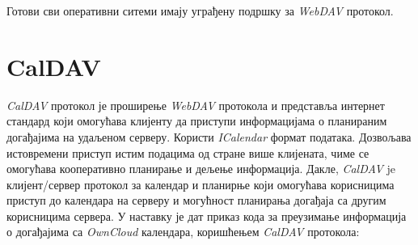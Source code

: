 Готови сви оперативни ситеми имају уграђену подршку за \textit{WebDAV} протокол.

\section {CalDAV}

\textit{CalDAV} протокол је проширење \textit{WebDAV} протокола и представља  интернет стандард који омогућава клијенту да приступи информацијама о планираним догађајима на удаљеном серверу. Користи \textit{ICalendar}\cite{ical} формат података. Дозвољава истовремени приступ истим подацима од стране више клијената, чиме се омогућава кооперативно планирање и дељење информација. Дакле, \textit{CalDAV} je клијент/сервер протокол за календар и планирње који омогућава корисницима приступ до календара на серверу и могућност планирања догађаја са другим корисницима сервера. У наставку је дат приказ кода за преузимање информација о догађајима са \textit{OwnCloud} календара, коришћењем \textit{CalDAV} протокола:

